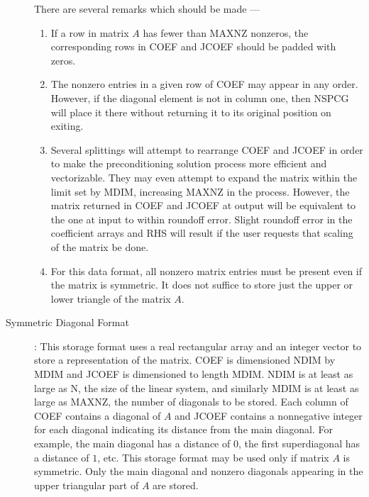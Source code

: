 \begin{description}
  There are several remarks which should be made ---
  \begin{enumerate}
  \item
       If a row in matrix $A$ has fewer than MAXNZ nonzeros,
       the corresponding rows in COEF and JCOEF should be
       padded with zeros.
  \item
       The nonzero entries in a given row of COEF may appear
       in any order.  However, if the diagonal element is not
       in column one, then NSPCG will place it there without
       returning it to its original position on exiting.
  \item
       Several splittings will attempt to rearrange COEF and
       JCOEF in order to make the preconditioning solution
       process more efficient and vectorizable.  They may
       even attempt to expand the matrix within the limit
       set by MDIM, increasing MAXNZ in the process.  However,
       the matrix returned in COEF and JCOEF at output will be
       equivalent to the one at input to within roundoff
       error.  Slight roundoff error in the coefficient
       arrays and RHS will result if the user requests that
       scaling of the matrix be done.
  \item
       For this data format, all nonzero matrix entries must be
       present even if the matrix is symmetric.  It does not
       suffice to store just the upper or lower triangle of
       the matrix $A$.
  \end{enumerate}
 
\newpage
\item[Symmetric Diagonal Format]:
  This storage format uses a real rectangular array and an
  integer vector to store a representation of the matrix.  COEF
  is dimensioned NDIM by MDIM and JCOEF is dimensioned to length
  MDIM.  NDIM is at least as large as N, the size of the linear
  system, and similarly MDIM is at least as large as MAXNZ, the
  number of diagonals to be stored.  Each column of COEF contains
  a diagonal of $A$ and JCOEF contains a nonnegative integer for
  each diagonal indicating its distance from the main diagonal.
  For example, the main diagonal has a distance of $0$, the first
  superdiagonal has a distance of $1$, etc.  This storage format may
  be used only if matrix $A$ is symmetric.  Only the main diagonal
  and nonzero diagonals appearing in the upper triangular part of
  $A$ are stored.
 

\end{description}
